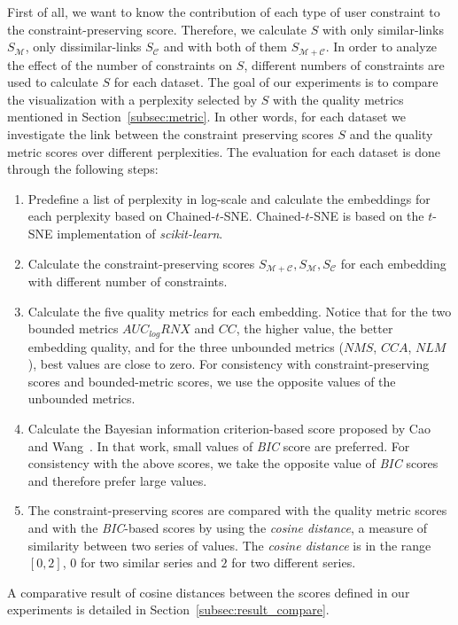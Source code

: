 First of all, we want to know the contribution of each type of user constraint to the constraint-preserving score. Therefore, we calculate $S$ with only similar-links $S_{\mathcal{M}}$, only dissimilar-links $S_{\mathcal{C}}$ and with both of them $S_{\mathcal{M+C}}$. 
In order to analyze the effect of the number of constraints on $S$, different numbers of constraints are used to calculate $S$ for each dataset. 
The goal of our experiments is to compare the visualization with a perplexity selected by $S$ with the quality metrics mentioned in Section~\ref{subsec:metric}. 
In other words, for each dataset we investigate the link between the constraint preserving scores $S$ and the quality metric scores over different perplexities. 
The evaluation for each dataset is done through the following steps:
\begin{enumerate}[leftmargin=*]
  \item Predefine a list of perplexity in log-scale and calculate the embeddings for each perplexity based on Chained-$t$-SNE.  Chained-$t$-SNE is based on the $t$-SNE implementation of \textit{scikit-learn}\cite{scikit-learn}.
  \item Calculate the constraint-preserving scores $S_{\mathcal{M+C}}, S_{\mathcal{M}}, S_{\mathcal{C}}$ for each embedding with different number of constraints.
  \item Calculate the five quality metrics for each embedding. Notice that for the two bounded metrics $AUC_{log}RNX$ and $CC$, the higher value, the better embedding quality, and for the three unbounded metrics ($NMS$, $CCA$, $NLM$), best values are close to zero. For consistency with constraint-preserving scores and bounded-metric scores, we use the opposite values of the unbounded metrics.
  \item Calculate the Bayesian information criterion-based score proposed by Cao and Wang~\cite{cao2017automatic}. In that work, small values of \emph{BIC} score are preferred. For consistency with the above scores, we take the opposite value of \emph{BIC} scores and therefore prefer large values.
  \item The constraint-preserving scores are compared with the quality metric scores and with the \emph{BIC}-based scores by using the \textit{cosine distance}, a measure of similarity between two series of values. The \textit{cosine distance} is in the range $[0,2]$, $0$ for two similar series and $2$ for two different series.
\end{enumerate}
A comparative result of cosine distances between the scores defined in our experiments is detailed in Section~\ref{subsec:result_compare}.

